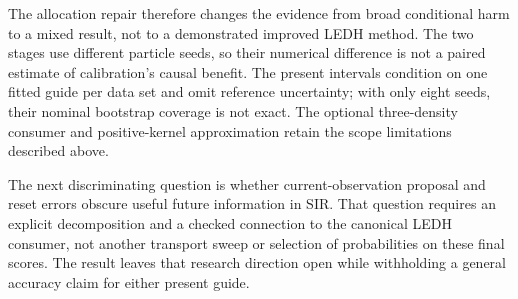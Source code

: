The allocation repair therefore changes the evidence from broad conditional
harm to a mixed result, not to a demonstrated improved LEDH method. The two
stages use different particle seeds, so their numerical difference is not
a paired estimate of calibration's causal benefit. The present intervals
condition on one fitted guide per data set and omit reference uncertainty;
with only eight seeds, their nominal bootstrap coverage is not exact.
The optional three-density consumer and positive-kernel approximation retain
the scope limitations described above.

The next discriminating question is whether current-observation proposal
and reset errors obscure useful future information in SIR. That question
requires an explicit decomposition and a checked connection to the canonical
LEDH consumer, not another transport sweep or selection of probabilities on
these final scores. The result leaves that research direction open while
withholding a general accuracy claim for either present guide.
